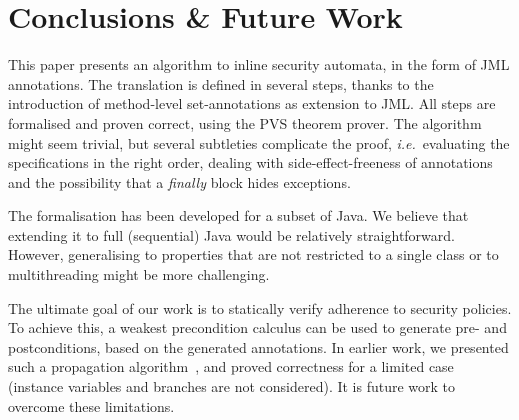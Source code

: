 \section{Conclusions \& Future Work }\label{SecConcl}

This paper presents an algorithm to inline security automata, in the
form of JML annotations. The translation is defined in several steps,
thanks to the introduction of method-level set-annotations as
extension to JML. All steps are formalised and proven correct, using
the PVS theorem prover. The algorithm might seem trivial, but several
subtleties complicate the proof, \emph{i.e.}~evaluating the
specifications in the right order, dealing with side-effect-freeness
of annotations and the possibility that a
\emph{finally} block hides exceptions. 


The formalisation has been developed for a subset of Java. We believe
that extending it to full (sequential) Java would be relatively
straightforward. However, generalising to properties that are not
restricted to a single class or to multithreading might be more
challenging.

The ultimate goal of our work is to statically verify adherence to
security policies. To achieve this, a weakest precondition calculus can
be used to generate pre- and postconditions, based on the generated
\Set annotations. In earlier work, we presented such a
propagation algorithm~\cite{PavlovaBBHL04}, and proved correctness for
a limited case (instance variables and branches are not
considered). It is future work to overcome these limitations.
